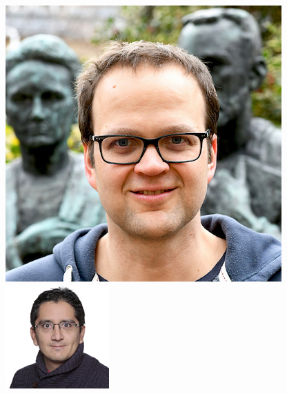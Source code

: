 \documentclass[xcolor=pdftex,dvipsnames,table,mathserif]{beamer}
\begin{document}
{\begin{columns}
  \begin{column}{.2\textwidth}
\vfill
\includegraphics[width=\textwidth]{ThomasWalter.jpg}\\
\vspace{2em}
    \includegraphics[width=\textwidth]{velascoforero}\\

\end{column}
\end{columns}}
\end{document}
